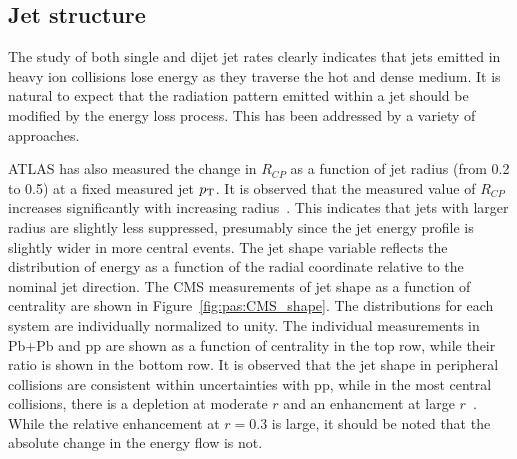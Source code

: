 \subsection{Jet structure}

The study of both single and dijet jet rates clearly indicates that jets emitted in heavy ion 
collisions lose energy as they traverse the hot and dense medium.  It is natural to expect
that the radiation pattern emitted within a jet should be modified by the energy loss
process.  This has been addressed by a variety of approaches.

ATLAS has also measured the change in $R_{CP}$ as a function of jet radius (from 0.2 to 0.5) at
a fixed measured jet $\mbox{$p_{\mathrm{T}}$}$.%
It is observed that the measured value of $R_{CP}$ increases significantly with increasing radius~\cite{Aad:2012is}.
This indicates that jets with larger radius are slightly less suppressed, presumably since 
the jet energy profile is slightly wider in more central events.
%
The jet shape variable reflects the distribution of energy as a function of the radial coordinate
relative to the nominal jet direction.
The CMS measurements of jet shape as a function of centrality are shown in Figure~\ref{fig:pas:CMS_shape}.
The distributions for each system are individually normalized to unity.
The individual measurements in Pb+Pb and pp are shown as a function of centrality in the top row,
while their ratio is shown in the bottom row.
It is observed that the jet shape in peripheral collisions are consistent within uncertainties with pp,
while in the most central collisions, there is a depletion at moderate $r$ and an enhancment at
large $r$~\cite{Chatrchyan:2013kwa}.
While the relative enhancement at $r=0.3$ is large, it should be noted that the absolute change in the energy
flow is not.

